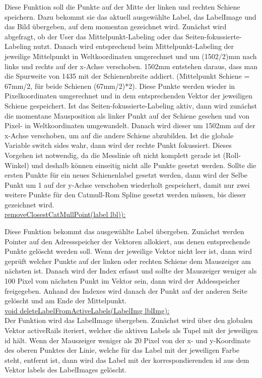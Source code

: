 \noindent
Diese Funktion soll die Punkte auf der Mitte der linken und rechten Schiene speichern. Dazu bekommt sie das aktuell ausgewählte Label, das LabelImage und das Bild übergeben, auf dem momentan gezeichnet wird. Zunächst wird abgefragt, ob der User das Mittelpunkt-Labeling oder das Seiten-fokussierte-Labeling nutzt. Danach wird entsprechend beim Mittelpunkt-Labeling der jeweilige Mittelpunkt in Weltkoordinaten umgerechnet und um (1502/2)mm nach links und rechts auf der x-Achse verschoben. 1502mm entstehen daraus, dass man die Spurweite von 1435 mit der Schienenbreite addiert. (Mittelpunkt Schiene = 67mm/2, für beide Schienen (67mm/2)*2). Diese Punkte werden wieder in Pixelkoordinaten umgerechnet und in dem entsprechenden Vektor der jeweiligen Schiene gespeichert. Ist das Seiten-fokussierte-Labeling aktiv, dann wird zunächst die momentane Mausposition als linker Punkt auf der Schiene gesehen und von Pixel- in Weltkoordinaten umgewandelt. Danach wird dieser um 1502mm auf der x-Achse verschoben, um auf die andere Schiene abzubilden. Ist die globale Variable switch sides wahr, dann wird der rechte Punkt fokussiert. Dieses Vorgehen ist notwendig, da die Messlinie oft nicht komplett gerade ist (Roll-Winkel) und deshalb können einseitig nicht alle Punkte gesetzt werden. Sollte die ersten Punkte für ein neues Schienenlabel gesetzt werden, dann wird der Selbe Punkt um 1 auf der y-Achse verschoben wiederholt gespeichert, damit nur zwei weitere Punkte für den Catmull-Rom Spline gesetzt werden müssen, bis dieser gezeichnet wird. 
\\

\noindent
\underline{removeClosestCatMullPoint(label lbl)):}


\noindent
Diese Funktion bekommt das ausgewählte Label übergeben. Zunächst werden Pointer auf den Adressspeicher der Vektoren allokiert, aus denen entsprechende Punkte gelöscht werden soll. Wenn der jeweilige Vektor nicht leer ist, dann wird geprüft welcher Punkte auf der linken oder rechten Schiene dem Mauszeiger am nächsten ist. Danach wird der Index erfasst und sollte der Mauszeiger weniger als 100 Pixel vom nächsten Punkt im Vektor sein, dann wird der Addesspeicher freigegeben. Anhand des Indexes wird danach der Punkt auf der anderen Seite gelöscht und am Ende der Mittelpunkt.
\\

\noindent
\underline{void deleteLabelFromActiveLabels(LabelImg lblImg):}
\\

\noindent
Der Funktion wird das LabelImage übergeben. Zunächst wird über den globalen Vektor activeRails iteriert, welcher die aktiven Labels als Tupel mit der jeweiligen id hält. Wenn der Mauszeiger weniger als 20 Pixel von der x- und y-Koordinate des oberen Punktes der Linie, welche für das Label mit der jeweiligen Farbe steht, entfernt ist, dann wird das Label mit der korrespondierenden id aus dem Vektor labels des LabelImages gelöscht.
\\

